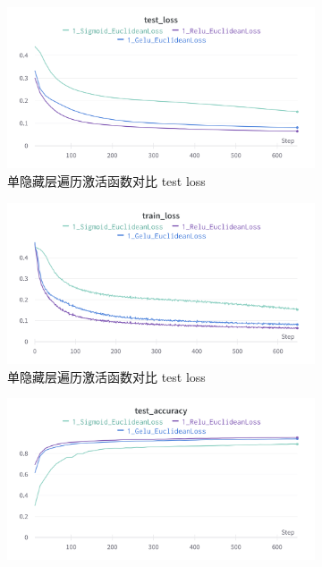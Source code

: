 \documentclass{article}
\begin{document}
\begin{figure}[htbp]
	\centering
	\begin{subfigure}{0.475\textwidth}
		\centering
		\includegraphics[width=1\textwidth]{../pics/单层激活函数test_loss.png}
		\caption{单隐藏层遍历激活函数对比 test loss}
	\end{subfigure}
	\begin{subfigure}{0.475\textwidth}
		\centering
		\includegraphics[width=1\textwidth]{../pics/单层激活函数train_loss.png}
		\caption{单隐藏层遍历激活函数对比 test loss}
	\end{subfigure}
	\begin{subfigure}{0.475\textwidth}
		\centering
		\includegraphics[width=1\textwidth]{../pics/单层激活函数test_acc.png}

\end{subfigure}
\end{figure}
\end{document}

